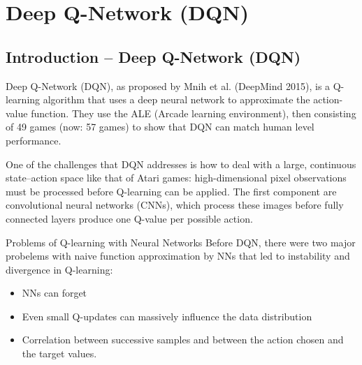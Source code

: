 \documentclass[11pt,a4paper]{article}
\newcommand{\nexttopic}{\clearpage}
\begin{document}
\nexttopic
\begingroup
\setlength{\parskip}{5pt plus 1pt}
\section{Deep Q-Network (DQN)}
\subsection{Introduction -- Deep Q-Network (DQN)}
Deep Q-Network (DQN), as proposed by Mnih et al. (DeepMind 2015), is
a Q-learning algorithm that uses a deep neural network to approximate the
action-value function. They use the ALE (Arcade learning environment), then
consisting of 49 games (now: 57 games) to show that DQN can match human
level performance.

One of the challenges that DQN addresses is how to deal with a large,
continuous state--action space like that of Atari games: high-dimensional pixel
observations must be processed before Q-learning can be applied. The first
component are convolutional neural networks (CNNs), which process these
images before fully connected layers produce one Q-value per possible action.

\begin{idea}{Problems of Q-learning with Neural Networks}
Before DQN, there were two major probelems with naive function approximation
by NNs that led to instability and divergence in Q-learning:
\begin{itemize}
 \item NNs can forget
 \item Even small Q-updates can massively influence the data distribution
 \item Correlation between successive samples and between the action chosen
 and the target values.
\end{itemize}
\end{idea}
\end{document}
